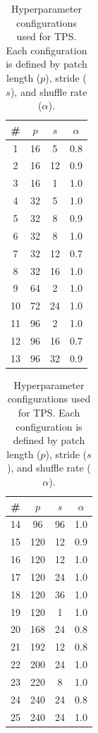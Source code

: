 \begin{table}[h!]
\centering
\begin{minipage}[t]{0.48\linewidth}
\centering
\begin{tabular}{@{}cccc@{}}
\toprule
\# & $p$ & $s$ & $\alpha$ \\
\midrule
1  & 16  & 5   & 0.8 \\
2  & 16  & 12  & 0.9 \\
3  & 16  & 1   & 1.0 \\
4  & 32  & 5   & 1.0 \\
5  & 32  & 8   & 0.9 \\
6  & 32  & 8   & 1.0 \\
7  & 32  & 12  & 0.7 \\
8  & 32  & 16  & 1.0 \\
9  & 64  & 2   & 1.0 \\
10 & 72  & 24  & 1.0 \\
11 & 96  & 2   & 1.0 \\
12 & 96  & 16  & 0.7 \\
13 & 96  & 32  & 0.9 \\
\bottomrule
\end{tabular}
\end{minipage}
\hfill
\begin{minipage}[t]{0.48\linewidth}
\centering
\begin{tabular}{@{}cccc@{}}
\toprule
\# & $p$ & $s$ & $\alpha$ \\
\midrule
14 & 96  & 96  & 1.0 \\
15 & 120 & 12  & 0.9 \\
16 & 120 & 12  & 1.0 \\
17 & 120 & 24  & 1.0 \\
18 & 120 & 36  & 1.0 \\
19 & 120 & 1   & 1.0 \\
20 & 168 & 24  & 0.8 \\
21 & 192 & 12  & 0.8 \\
22 & 200 & 24  & 1.0 \\
23 & 220 & 8   & 1.0 \\
24 & 240 & 24  & 0.8 \\
25 & 240 & 24  & 1.0 \\
\bottomrule
\end{tabular}
\end{minipage}
\caption{Hyperparameter configurations used for TPS. Each configuration is defined by patch length ($p$), stride ($s$), and shuffle rate ($\alpha$).}
\label{tab:tps_parameters_split1}
\end{table}



